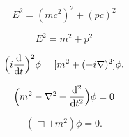 \documentclass[aspectratio=169]{beamer}
\begin{document}
\begin{frame}[plain]
    \centering
    \Huge
    \[
        E^2 = (mc^2)^2 + (pc)^2
    \] 
\end{frame}


\begin{frame}[plain]
    \centering
    \Huge
    \[
        E^2 = m^2 + p^2 
    \] 
    
    \[
        \Big(i \dv[]{}{t}\Big)^2 \phi = [m^2 + (-i \nabla)^2] \phi
    .\] 
\end{frame}

\begin{frame}[plain]
    \centering
    \Huge
    \[
        \Big(m^2 - \nabla^2 + \dv[2]{}{t}\Big) \phi = 0
    \] 
\end{frame}


\begin{frame}[plain]
    \centering
    \Huge
    \[
        (\Box + m^2) \phi = 0 
    .\] 
\end{frame}
    
\end{document}
